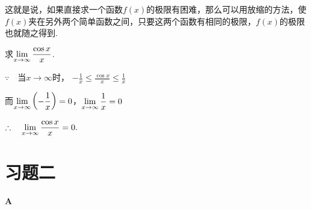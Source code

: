 这就是说，如果直接求一个函数$f(x)$的极限有困难，那么可以用放缩的方法，使$f(x)$夹在另外两个简单函数之间，只要这两个函数有相同的极限，$f(x)$的极限也就随之得到.


\begin{example}
求$\lim\limits_{x\to \infty}\dfrac{\cos x}{x}$.
\end{example}

\begin{solution}
$\because\quad $当$x\to \infty$时， $-\frac{1}{x}\le \frac{\cos x }{x}\le \frac{1}{x}$

而$\lim\limits_{x\to \infty}\left(-\dfrac{1}{x}\right)=0$，$\lim\limits_{x\to \infty}\dfrac{1}{x}=0$

$\therefore\quad \lim\limits_{x\to \infty}\dfrac{\cos x}{x}=0.$
\end{solution}

\section*{习题二}
\begin{center}
    \bfseries A
\end{center}

